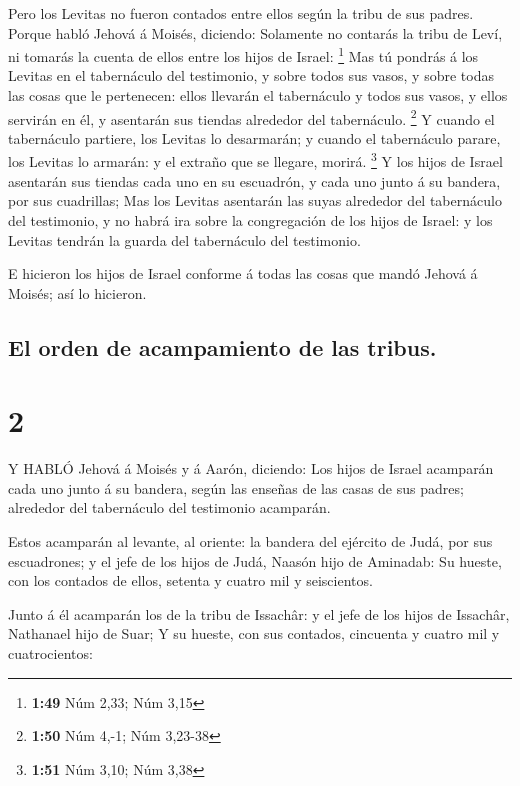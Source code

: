  Pero los Levitas no fueron contados entre ellos según la
tribu de sus padres.  Porque habló Jehová á Moisés,
diciendo:  Solamente no contarás la tribu de Leví, ni
tomarás la cuenta de ellos entre los hijos de Israel: \footnote{\textbf{1:49}
  Núm 2,33; Núm 3,15}  Mas tú pondrás á los Levitas en el
tabernáculo del testimonio, y sobre todos sus vasos, y sobre todas las
cosas que le pertenecen: ellos llevarán el tabernáculo y todos sus
vasos, y ellos servirán en él, y asentarán sus tiendas alrededor del
tabernáculo. \footnote{\textbf{1:50} Núm 4,-1; Núm 3,23-38}
 Y cuando el tabernáculo partiere, los Levitas lo
desarmarán; y cuando el tabernáculo parare, los Levitas lo armarán: y el
extraño que se llegare, morirá. \footnote{\textbf{1:51} Núm 3,10; Núm
  3,38}  Y los hijos de Israel asentarán sus tiendas cada
uno en su escuadrón, y cada uno junto á su bandera, por sus cuadrillas;
 Mas los Levitas asentarán las suyas alrededor del
tabernáculo del testimonio, y no habrá ira sobre la congregación de los
hijos de Israel: y los Levitas tendrán la guarda del tabernáculo del
testimonio.

 E hicieron los hijos de Israel conforme á todas las cosas
que mandó Jehová á Moisés; así lo hicieron.

\hypertarget{el-orden-de-acampamiento-de-las-tribus.}{%
\subsection{El orden de acampamiento de las
tribus.}\label{el-orden-de-acampamiento-de-las-tribus.}}

\hypertarget{section-1}{%
\section{2}\label{section-1}}

 Y HABLÓ Jehová á Moisés y á Aarón, diciendo: 
Los hijos de Israel acamparán cada uno junto á su bandera, según las
enseñas de las casas de sus padres; alrededor del tabernáculo del
testimonio acamparán.

 Estos acamparán al levante, al oriente: la bandera del
ejército de Judá, por sus escuadrones; y el jefe de los hijos de Judá,
Naasón hijo de Aminadab:  Su hueste, con los contados de
ellos, setenta y cuatro mil y seiscientos.

 Junto á él acamparán los de la tribu de Issachâr: y el jefe
de los hijos de Issachâr, Nathanael hijo de Suar;  Y su
hueste, con sus contados, cincuenta y cuatro mil y cuatrocientos:

